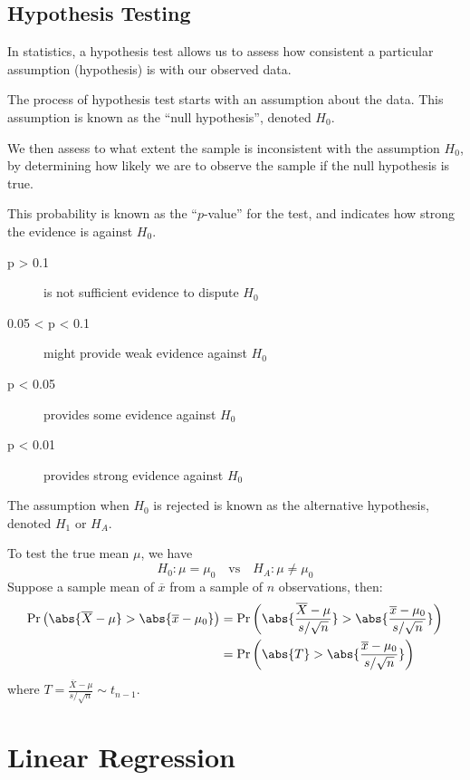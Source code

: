\documentclass{article}
\begin{document}
\subsection{Hypothesis Testing}
\begin{definition}
    In statistics, a hypothesis test allows us to assess how
    consistent a particular assumption (hypothesis) is with our
    observed data.
    
    The process of hypothesis test starts with an assumption about the
    data. This assumption is known as the ``null hypothesis'', denoted $H_0$.
    
    We then assess to what extent the sample is inconsistent with the assumption $H_0$, 
    by determining how likely we are to observe the sample if the null hypothesis is true.
    
    This probability is known as the ``$p$-value'' for the test, and indicates how strong the
    evidence is against $H_0$.
    \begin{description}
        \item[p > 0.1] is not sufficient evidence to dispute $H_0$ 
        \item[0.05 < p < 0.1] might provide weak evidence against $H_0$ 
        \item[p < 0.05] provides some evidence against $H_0$ 
        \item[p < 0.01] provides strong evidence against $H_0$ 
    \end{description}
    The assumption when $H_0$ is rejected is known as the alternative hypothesis, denoted $H_1$ or $H_A$.
    
    To test the true mean $\mu$, we have
    \begin{equation*}
        H_0:\mu = \mu_0 \quad \text{vs} \quad H_A:\mu \neq \mu_0
    \end{equation*}
    Suppose a sample mean of $\overline{x}$ from a sample of $n$ observations, then:
    \begin{align*}
        \Pr{\left( \abs{\overline{X} - \mu} > \abs{\overline{x} - \mu_0} \right)} & = \Pr{\left( \abs{\frac{\overline{X} - \mu}{s/\sqrt{n}}} > \abs{\frac{\overline{x} - \mu_0}{s/\sqrt{n}}} \right)} \\
        & = \Pr{\left( \abs{T} > \abs{\frac{\overline{x} - \mu_0}{s/\sqrt{n}}} \right)}
    \end{align*}
    where $T=\frac{\overline{X} - \mu}{s/\sqrt{n}}\sim t_{n-1}$.
\end{definition}
\section{Linear Regression}
\end{document}
